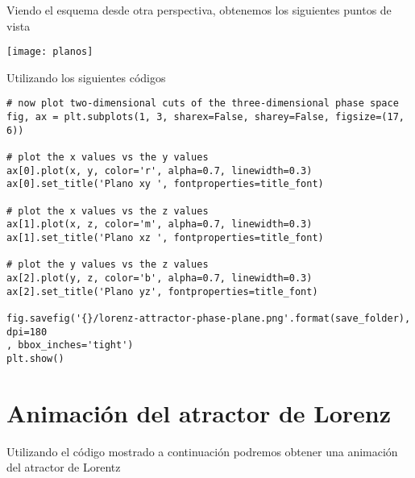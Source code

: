 \documentclass[12pt]{article}
\begin{document}
Viendo el esquema desde otra perspectiva, obtenemos los siguientes puntos de vista

\begin{center}
\texttt{[image: planos]}
\end{center}

Utilizando los siguientes códigos
\begin{verbatim}
# now plot two-dimensional cuts of the three-dimensional phase space
fig, ax = plt.subplots(1, 3, sharex=False, sharey=False, figsize=(17, 6))

# plot the x values vs the y values
ax[0].plot(x, y, color='r', alpha=0.7, linewidth=0.3)
ax[0].set_title('Plano xy ', fontproperties=title_font)

# plot the x values vs the z values
ax[1].plot(x, z, color='m', alpha=0.7, linewidth=0.3)
ax[1].set_title('Plano xz ', fontproperties=title_font)

# plot the y values vs the z values
ax[2].plot(y, z, color='b', alpha=0.7, linewidth=0.3)
ax[2].set_title('Plano yz', fontproperties=title_font)

fig.savefig('{}/lorenz-attractor-phase-plane.png'.format(save_folder), dpi=180
, bbox_inches='tight') 
plt.show()
\end{verbatim}

\section*{Animación del atractor de Lorenz}

Utilizando el código mostrado a continuación podremos obtener una animación del atractor de Lorentz
\end{document}
